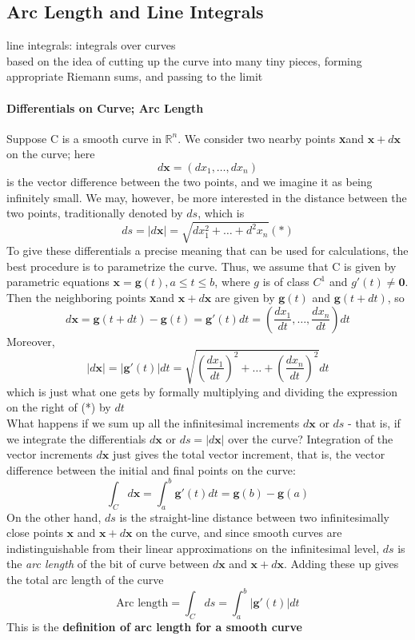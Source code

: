 \documentclass[11pt]{article}
\newcommand{\ti}[1]{\textit{#1}}
\newcommand{\tb}[1]{\textbf{#1}}
\newcommand{\real}[0]{\mathbb{R}}
\newcommand{\vx}[0]{\tb{x}}
\newcommand{\vo}[0]{\tb{0}}
\begin{document}
\subsection{Arc Length and Line Integrals}
line integrals: integrals over curves\\
based on the idea of cutting up the curve into many tiny pieces, forming appropriate Riemann sums, and passing to the limit
\paragraph{Differentials on Curve; Arc Length} Suppose C is a smooth curve in $\real^n$. We consider two nearby points \vx and $\vx + d\vx$ on the curve; here
$$d\vx = (dx_1,\hdots,dx_n)$$
is the vector difference between the two points, and we imagine it as being infinitely small. We may, however, be more interested in the distance between the two points, traditionally denoted by $ds$, which is $$ds = |d\vx| = \sqrt{dx^2_1+\hdots+d^2x_n}(*)$$
To give these differentials a precise meaning that can be used for calculations, the best procedure is to parametrize the curve. Thus, we assume that C is given by parametric equations $\vx = \tb{g}(t), a\leq t \leq b$, where $g$ is of class $C^1$ and $g'(t) \neq \vo$. Then the neighboring points \vx and $\vx + d\vx$ are given by $\tb{g}(t)$ and $\tb{g}(t+dt)$, so $$d\vx = \tb{g}(t+dt) - \tb{g}(t) = \tb{g}'(t)dt = (\frac{dx_1}{dt},\hdots,\frac{dx_n}{dt})dt$$ Moreover,
$$|d\vx| = |\tb{g}'(t)|dt = \sqrt{(\frac{dx_1}{dt})^2+ \hdots + (\frac{dx_n}{dt})^2}dt$$which is just what one gets by formally multiplying and dividing the expression on the right of (*) by $dt$\\
What happens if we sum up all the infinitesimal increments $d\vx$ or $ds$ - that is, if we integrate the differentials $d\vx$ or $ds = |d\vx|$ over the curve? Integration of the vector increments $d\vx$ just gives the total vector increment, that is, the vector difference between the initial and final points on the curve:
$$\int_C d\vx = \int_a^b \tb{g}'(t)dt = \tb{g}(b)-\tb{g}(a)$$
On the other hand, $ds$ is the straight-line distance between two infinitesimally close points $\vx$ and $\vx + d\vx$ on the curve, and since smooth curves are indistinguishable from their linear approximations on the infinitesimal level, $ds$ is the \ti{arc length} of the bit of curve between $d\vx$ and $\vx + d\vx$. Adding these up gives the total arc length of the curve
$$\mbox{Arc length} = \int_C ds = \int_a^b|\tb{g}'(t)|dt$$
This is the \tb{definition of arc length for a smooth curve}
\end{document}
